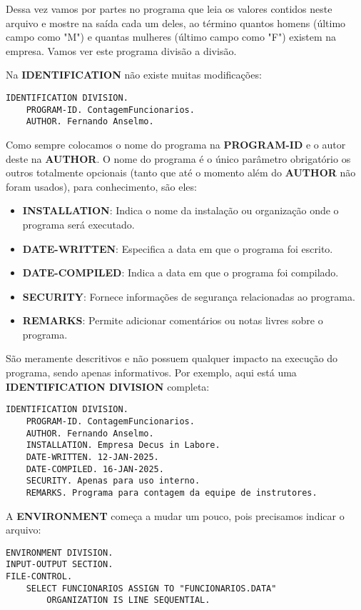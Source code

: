 Dessa vez vamos por partes no programa que leia os valores contidos neste arquivo e mostre na saída cada um deles, ao término quantos homens (último campo como "M") e quantas mulheres (último campo como "F") existem na empresa. Vamos ver este programa divisão a divisão.

Na \textbf{IDENTIFICATION} não existe muitas modificações:
\begin{lstlisting}[]
IDENTIFICATION DIVISION.
    PROGRAM-ID. ContagemFuncionarios.
    AUTHOR. Fernando Anselmo.	
\end{lstlisting}

Como sempre colocamos o nome do programa na \textbf{PROGRAM-ID} e o autor deste na \textbf{AUTHOR}. O nome do programa é o único parâmetro obrigatório os outros totalmente opcionais (tanto que até o momento além do \textbf{AUTHOR} não foram usados), para conhecimento, são eles:
\begin{itemize}
	\item \textbf{INSTALLATION}: Indica o nome da instalação ou organização onde o programa será executado.
	\item \textbf{DATE-WRITTEN}: Especifica a data em que o programa foi escrito.
	\item \textbf{DATE-COMPILED}: Indica a data em que o programa foi compilado.
	\item \textbf{SECURITY}: Fornece informações de segurança relacionadas ao programa.
	\item \textbf{REMARKS}: Permite adicionar comentários ou notas livres sobre o programa.
\end{itemize}

São meramente descritivos e não possuem qualquer impacto na execução do programa, sendo apenas informativos. Por exemplo, aqui está uma \textbf{IDENTIFICATION DIVISION} completa:
\begin{lstlisting}[]
IDENTIFICATION DIVISION.
    PROGRAM-ID. ContagemFuncionarios.
    AUTHOR. Fernando Anselmo.
    INSTALLATION. Empresa Decus in Labore.
    DATE-WRITTEN. 12-JAN-2025.
    DATE-COMPILED. 16-JAN-2025.
    SECURITY. Apenas para uso interno.
    REMARKS. Programa para contagem da equipe de instrutores.
\end{lstlisting}

A \textbf{ENVIRONMENT} começa a mudar um pouco, pois precisamos indicar o arquivo:
\begin{lstlisting}[]
ENVIRONMENT DIVISION.
INPUT-OUTPUT SECTION.
FILE-CONTROL.
    SELECT FUNCIONARIOS ASSIGN TO "FUNCIONARIOS.DATA"
        ORGANIZATION IS LINE SEQUENTIAL.	
\end{lstlisting}

